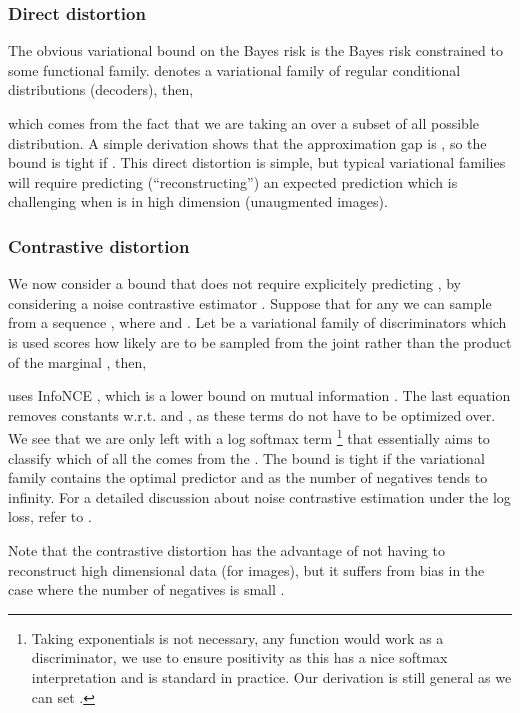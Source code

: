 \documentclass[final]{article}
\begin{document}
\subsubsection{Direct distortion}
\label{appx:direct_dist}

The obvious variational bound on the Bayes risk is the Bayes risk constrained to some functional family. 
 denotes a variational family of regular conditional distributions (decoders), then, 

which comes from the fact that we are taking an  over a subset  of all possible distribution.
A simple derivation shows that the approximation gap is , so the bound is tight if .
This direct distortion is simple, but typical variational families will require predicting (``reconstructing'') an expected prediction  which is challenging when   is in high dimension (\eg unaugmented images).


\subsubsection{Contrastive distortion}
\label{appx:contrastive_dist}

We now consider a bound that does not require explicitely predicting , by considering a noise contrastive estimator \cite{gutmann_noise-contrastive_2010}.
Suppose that for any  we can sample from a sequence , where  and .
Let  be a variational family of discriminators which is used scores how likely  are to be sampled from the joint  rather than the product of the marginal , then,

 uses InfoNCE \cite{oord_representation_2019}, which is a lower bound on mutual information \cite{poole_variational_2019,song_multi-label_2020}.
The last equation removes constants w.r.t.  and , as these terms do not have to be optimized over.
We see that we are only left with a log softmax term
\footnote{Taking exponentials is not necessary, any function  would work as a discriminator, we use  to ensure positivity as this has a nice softmax interpretation and is standard in practice.
Our derivation is still general as we can set .
}
that essentially aims to classify which of all the  comes from the .
The bound is tight if the variational family  contains the optimal predictor 
and as the number of negatives tends to infinity.
For a detailed discussion about noise contrastive estimation under the log loss, refer to \cite{gutmann_noise-contrastive_2010,ma_noise_2018,rhodes_variational_2019}.

Note that the contrastive distortion has the advantage of not having to reconstruct high dimensional data (\eg for images), but it suffers from bias in the case where the number of negatives  is small \cite{poole_variational_2019}.
\end{document}
